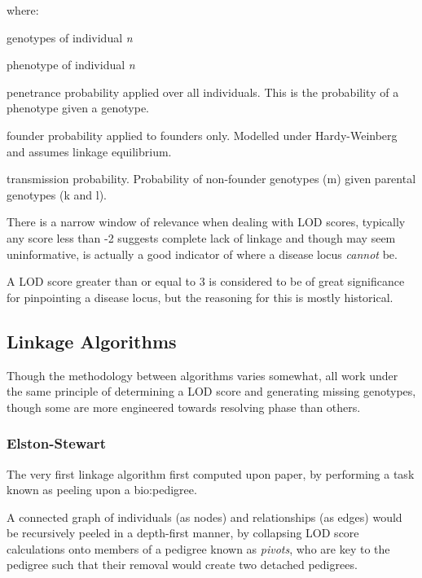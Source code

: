 where:
\begin{spacing}{1}
\begin{description}[labelsep=2em, align=right, labelwidth=3em, labelindent=4em, leftmargin=*]
\item[\(g_n\)]{genotypes of individual \textit{n}}
\item[\(Y_n\)]{phenotype of individual \textit{n}}
\item[\(P(Y_i|g_i)\)]{penetrance probability applied over all individuals. This is the probability of a phenotype given a genotype.}
\item[\(P(g_j)\)]{founder probability applied to founders only. Modelled under Hardy-Weinberg and assumes linkage equilibrium.}
\item[\(P(g_m|g_k,g_l)\)]{transmission probability. Probability of non-founder genotypes (m) given parental genotypes (k and l).}
\end{description}
\end{spacing}


There is a narrow window of relevance when dealing with LOD scores, typically any score less than -2 suggests complete lack of linkage and though may seem uninformative, is actually a good indicator of where a disease locus \textit{cannot} be.

A LOD score greater than or equal to 3 is considered to be of great significance for pinpointing a disease locus, but the reasoning for this is mostly historical.

\subsection{Linkage Algorithms}

Though the methodology between algorithms varies somewhat, all work under the same principle of determining a LOD score and generating missing genotypes, though some are more engineered towards resolving phase than others.

\subsubsection{Elston-Stewart}\label{ref:back:els}

The very first linkage algorithm first computed upon paper, by performing a task known as peeling upon a \gls{bio:pedigree}.

A connected graph of individuals (as nodes) and relationships (as edges) would be recursively peeled in a depth-first manner, by collapsing LOD score calculations onto members of a pedigree known as \textit{pivots}, who are key to the pedigree such that their removal would create two detached pedigrees. 

